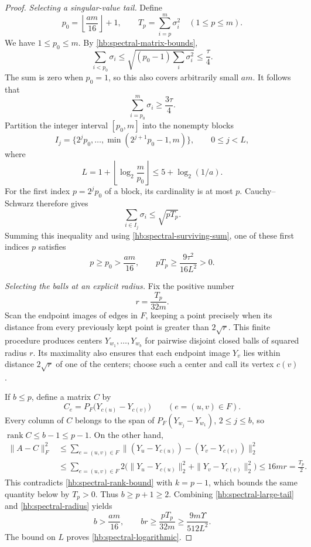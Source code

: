 \documentclass[11pt]{amsart}
\DeclareMathOperator{\rank}{rank}
\theoremstyle{definition}
\theoremstyle{remark}
\numberwithin{equation}{section}
\begin{document}
\begin{proof}
\smallskip
\noindent\emph{Selecting a singular-value tail.}
Define
\[
 p_0=\left\lfloor\frac{am}{16}\right\rfloor+1,
 \qquad T_p=\sum_{i=p}^m\sigma_i^2\quad(1\le p\le m).
\]
We have \(1\le p_0\le m\).  By \eqref{hb:spectral-matrix-bounds},
\[
 \sum_{i<p_0}\sigma_i
 \le\sqrt{(p_0-1)\sum_i\sigma_i^2}
 \le\frac\tau4.
\]
The sum is zero when \(p_0=1\), so this also covers arbitrarily small
\(am\).  It follows that
\begin{equation}\label{hb:spectral-surviving-sum}
 \sum_{i=p_0}^m\sigma_i\ge\frac{3\tau}{4}.
\end{equation}
Partition the integer interval \([p_0,m]\) into the nonempty blocks
\[
 I_j=\{2^jp_0,\ldots,\min(2^{j+1}p_0-1,m)\},
 \qquad 0\le j<L,
\]
where
\[
 L=1+\left\lfloor\log_2\frac m{p_0}\right\rfloor
 \le 5+\log_2(1/a).
\]
For the first index \(p=2^jp_0\) of a block, its cardinality is at
most \(p\).  Cauchy--Schwarz therefore gives
\[
 \sum_{i\in I_j}\sigma_i\le\sqrt{pT_p}.
\]
Summing this inequality and using
\eqref{hb:spectral-surviving-sum}, one of these first indices \(p\)
satisfies
\begin{equation}\label{hb:spectral-large-tail}
 p\ge p_0>\frac{am}{16},
 \qquad
 pT_p\ge\frac{9\tau^2}{16L^2}>0.
\end{equation}

\smallskip
\noindent\emph{Selecting the balls at an explicit radius.}
Fix the positive number
\begin{equation}\label{hb:spectral-radius}
 r=\frac{T_p}{32m}.
\end{equation}
Scan the endpoint images of edges in \(F\), keeping a point precisely
when its distance from every previously kept point is greater than
\(2\sqrt r\).  This finite procedure produces centers
\(Y_{w_1},\ldots,Y_{w_b}\) for pairwise disjoint closed balls of
squared radius \(r\).  Its maximality also ensures that each endpoint
image \(Y_v\) lies within distance \(2\sqrt r\) of one of the
centers; choose such a center and call its vertex \(c(v)\).

If \(b\le p\), define a matrix \(C\) by
\[
 C_e=P_F\bigl(Y_{c(u)}-Y_{c(v)}\bigr)
 \qquad(e=(u,v)\in F).
\]
Every column of \(C\) belongs to the span of
\(P_F(Y_{w_j}-Y_{w_1})\), \(2\le j\le b\), so
\(\rank C\le b-1\le p-1\).  On the other hand,
\begin{align*}
 \|A-C\|_F^2
 &\le\sum_{e=(u,v)\in F}
 \bigl\|(Y_u-Y_{c(u)})-(Y_v-Y_{c(v)})\bigr\|_2^2\\
 &\le\sum_{e=(u,v)\in F}
 2\bigl(\|Y_u-Y_{c(u)}\|_2^2+
          \|Y_v-Y_{c(v)}\|_2^2\bigr)
 \le16mr=\frac{T_p}{2}.
\end{align*}
This contradicts \eqref{hb:spectral-rank-bound} with \(k=p-1\),
which bounds the same quantity below by \(T_p>0\).
Thus \(b\ge p+1\ge2\).  Combining
\eqref{hb:spectral-large-tail} and \eqref{hb:spectral-radius} yields
\[
 b>\frac{am}{16},
 \qquad
 br\ge\frac{pT_p}{32m}
 \ge\frac{9m\Upsilon}{512L^2}.
\]
The bound on \(L\) proves \eqref{hb:spectral-logarithmic}.


\end{proof}
\end{document}
